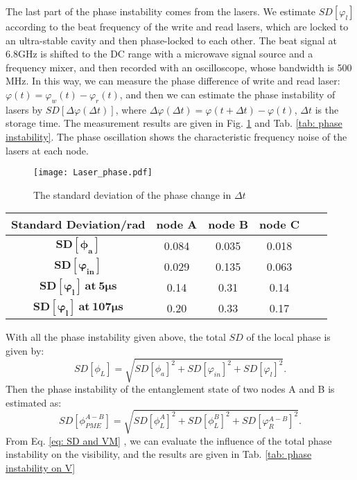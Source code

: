 \documentclass[aps,reprint,showpacs,superscriptaddress]{revtex4-2}
\begin{document}

The last part of the phase instability comes from the lasers. We estimate $SD[\varphi_l]$ according to the beat frequency of the write and read lasers, which are locked to an ultra-stable cavity and then phase-locked to each other. The beat signal at 6.8GHz is shifted to the DC range with a microwave signal source and a frequency mixer, and then recorded with an oscilloscope, whose bandwidth is 500 MHz.  In this way, we can measure the phase difference of write and read laser: $\varphi(t)=\varphi_w(t)-\varphi_r(t)$, and then we can estimate the phase instability of  lasers by $SD[\Delta\varphi(\Delta t)]$, where $\Delta\varphi(\Delta t)=\varphi(t+\Delta t)-\varphi(t)$, $\Delta t$ is the storage time. The measurement results are given in Fig. \ref{fig:laser phase} and Tab. \ref{tab: phase instability}. The phase oscillation shows the characteristic frequency noise of the lasers at each node. 
\begin{figure}[htbp]
	\centering
	\texttt{[image: Laser\_phase.pdf]}
	\caption{The standard deviation of the phase change in $\Delta t$}
	\label{fig:laser phase}
\end{figure}
\begin{table*}[!htbp]
	\caption{The phase instability of memories, Interferometers and lasers.}
	\label{tab: phase instability}
	\renewcommand\arraystretch{1.2}
	\begin{ruledtabular}
	\begin{tabular}{cccccc}
		\textbf{Standard Deviation/rad}& \textbf{node} $\bm{A}$ & \textbf{node} $\bm{B}$ & \textbf{node} $\bm{C}$ \\
		\hline
		$\bm{SD[\phi_a]}$ &0.084&0.035&0.018\\
		$\bm{SD[\varphi_{in}]}$ &0.029&0.135&0.063\\
		$\bm{SD[\varphi_l]\  at \ 5 \mu s}$ &0.14&0.31&0.14\\
		$\bm{SD[\varphi_l] \ at\  107\mu s}$ &0.20&0.33&0.17\\
	\end{tabular}
\end{ruledtabular}
\end{table*}

With all the phase instability given above, the total $SD$ of the local phase  is given by:
\begin{equation}
	SD[\phi_L]=\sqrt{SD[\phi_a]^2+SD[\varphi_{in}]^2+SD[\varphi_l]^2}.
\end{equation}
Then the phase instability of the entanglement state of two nodes A and B is estimated as:
\begin{equation}
	SD[\phi_{PME}^{A-B}]=\sqrt{SD[\phi_L^A]^2+SD[\phi_L^B]^2+SD[\varphi_R^{A-B}]^2}.
\end{equation}
From Eq. \ref{eq: SD and VM} , we can evaluate the influence of the total phase instability on the visibility, and the results are given in Tab. \ref{tab: phase instability on V}
\end{document}
